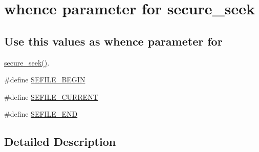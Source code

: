 \hypertarget{group___seek___defines}{\section{whence parameter for secure\-\_\-seek}
\label{group___seek___defines}
}
\subsection*{Use this values as whence parameter for}
\label{_amgrp2f36fb5bbc515d158e6cb06792c45317}%
\hyperlink{_s_efile_8c_a157807247b4913a73fc3b6677a61e6a3}{secure\-\_\-seek()}. \begin{DoxyCompactItemize}
\item 
\#define \hyperlink{group___seek___defines_gab6c0208f58dfecf3ee595f75a3156a27}{S\-E\-F\-I\-L\-E\-\_\-\-B\-E\-G\-I\-N}
\item 
\#define \hyperlink{group___seek___defines_ga96800ac1f03fb12ac3f761d37553ddc3}{S\-E\-F\-I\-L\-E\-\_\-\-C\-U\-R\-R\-E\-N\-T}
\item 
\#define \hyperlink{group___seek___defines_gac99113dc9b1f7710c8f451ce0b76c925}{S\-E\-F\-I\-L\-E\-\_\-\-E\-N\-D}
\end{DoxyCompactItemize}


\subsection{Detailed Description}


